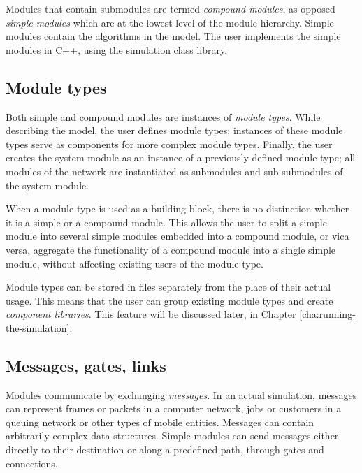 Modules that contain submodules are termed \textit{compound
  modules}, as opposed \textit{simple
  modules} which are at the lowest level of the
module hierarchy. Simple modules contain the algorithms in the model.
The user implements the simple modules in C++, using the {\opp}
simulation class library.


\subsection{Module types}

Both simple and compound modules are instances of \textit{module
  types}. While describing the model, the user defines module types;
instances of these module types serve as components for more complex
module types. Finally, the user creates the system module as an
instance of a previously defined module type; all modules of the
network are instantiated as submodules and sub-submodules of the
system module.


When a module type is used as a building block, there is no
distinction whether it is a simple or a compound module. This allows
the user to split a simple module into several
simple modules embedded into a compound module,
or vica versa, aggregate the functionality of a compound module into a
single simple module, without affecting existing users of the module
type.


Module types can be stored in files separately from the place
of their actual usage. This means that the user can group existing
module types and create \textit{component libraries}. This feature
will be discussed later, in Chapter \ref{cha:running-the-simulation}.



\subsection{Messages, gates, links}

Modules communicate by exchanging
\textit{messages}. In an actual simulation,
messages can represent frames or packets in a computer network, jobs
or customers in a queuing network or other types of mobile entities.
Messages can contain arbitrarily complex data structures. Simple
modules can send messages either directly to their destination or
along a predefined path, through gates and connections.


